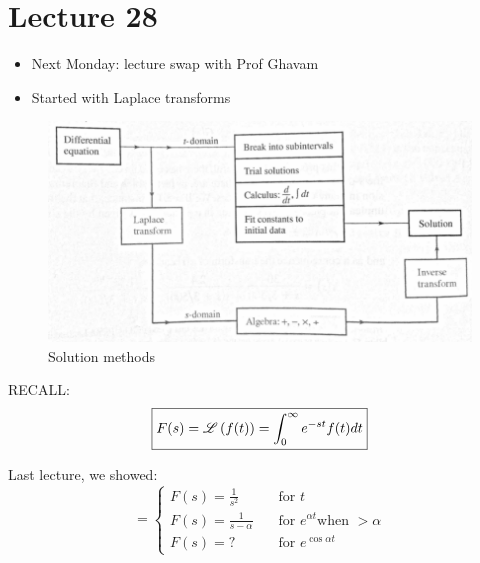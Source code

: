 
\chapter*{Lecture 28}

\begin{recall}{}{}
\begin{itemize}
\item Next Monday: lecture swap with Prof Ghavam
\item Started with Laplace transforms
\end{itemize}
\end{recall}


\begin{figure}
\includegraphics[width=\textwidth]{figs/LaplaceExample.png} 
\caption{Solution methods}
\end{figure}


RECALL:
\begin{equation}
\boxed{F(s)=\operatorname{\mathscr{L}}\left( f(t) \right) =\int^\infty_0 e^{-st} f(t) dt}
\end{equation}





Last lecture, we showed:
\begin{equation*}
=
\begin{cases}
   F(s)=\frac{1}{s^2} \qquad &\text{for } t\\
   F(s)=\frac{1}{s-\alpha}  &\text{for } e^{\alpha t} \text {when }>\alpha\\
   F(s)= ? &\text{for } e^{\cos \alpha t}
\end{cases}
\end{equation*}



